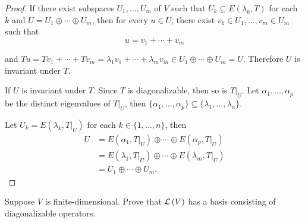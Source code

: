 \begin{proof}
    If there exist subspaces $U_{1}, \ldots, U_{m}$ of $V$ such that $U_{k}\subseteq E(\lambda_{k}, T)$ for each $k$ and $U = U_{1}\oplus \cdots \oplus U_{m}$, then for every $u\in U$, there exist $v_{1}\in U_{1}, \ldots, v_{m}\in U_{m}$ such that
    \[
        u = v_{1} + \cdots + v_{m}
    \]

    and $Tu = Tv_{1} + \cdots + Tv_{m} = \lambda_{1}v_{1} + \cdots + \lambda_{m}v_{m}\in U_{1}\oplus \cdots \oplus U_{m} = U$. Therefore $U$ is invariant under $T$.

    \bigskip

    If $U$ is invariant under $T$. Since $T$ is diagonalizable, then so is $T\vert_{U}$. Let $\alpha_{1}, \ldots, \alpha_{p}$ be the distinct eigenvalues of $T\vert_{U}$, then $\{ \alpha_{1}, \ldots, \alpha_{p} \}\subseteq \{ \lambda_{1}, \ldots, \lambda_{n} \}$.

    Let $U_{k} = E(\lambda_{k}, T\vert_{U})$ for each $k\in\{ 1, \ldots, n \}$, then
    \begin{align*}
        U & = E(\alpha_{1}, T\vert_{U})\oplus\cdots\oplus E(\alpha_{p}, T\vert_{U})   \\
          & = E(\lambda_{1}, T\vert_{U})\oplus\cdots\oplus E(\lambda_{m}, T\vert_{U}) \\
          & = U_{1}\oplus\cdots \oplus U_{m}.
    \end{align*}
\end{proof}
\newpage

\begin{exercise}
    Suppose $V$ is finite-dimensional. Prove that $\mathcal{L}\left({V}\right)$ has a basis consisting of diagonalizable operators.
\end{exercise}

